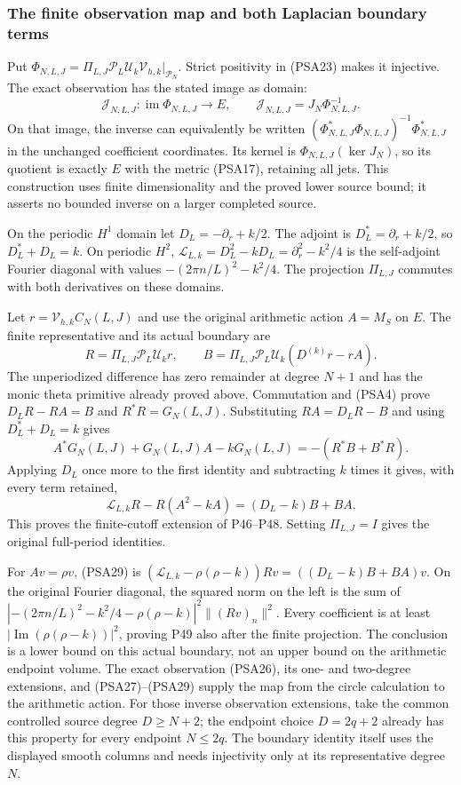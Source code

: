 \subsubsection{The finite observation map and both Laplacian boundary terms}

Put $\Phi_{N,L,J}=\Pi_{L,J}\mathcal P_L\mathcal U_k
\mathcal V_{h,k}|_{\mathcal P_N}$. Strict positivity in (PSA23)
makes it injective. The exact observation has the stated image as
domain:
\[
 \mathcal J_{N,L,J}:\operatorname{im}\Phi_{N,L,J}\longrightarrow E,
 \qquad
 \mathcal J_{N,L,J}=J_N\Phi_{N,L,J}^{-1}.
 \tag{PSA26}
\]
On that image, the inverse can equivalently be written
$(\Phi_{N,L,J}^*\Phi_{N,L,J})^{-1}\Phi_{N,L,J}^*$ in the unchanged
coefficient coordinates. Its kernel is
$\Phi_{N,L,J}(\ker J_N)$, so its quotient is exactly $E$ with the
metric (PSA17), retaining all jets. This construction uses finite
dimensionality and the proved lower source bound; it asserts no
bounded inverse on a larger completed source.

On the periodic $H^1$ domain let $D_L=-\partial_r+k/2$.
The adjoint is $D_L^*=\partial_r+k/2$, so $D_L^*+D_L=k$.
On periodic $H^2$, $\mathscr L_{L,k}=D_L^2-kD_L
=\partial_r^2-k^2/4$ is the self-adjoint Fourier diagonal with
values $-(2\pi n/L)^2-k^2/4$. The projection $\Pi_{L,J}$ commutes
with both derivatives on these domains.

Let $r=\mathcal V_{h,k}C_N(L,J)$ and use the original arithmetic
action $A=M_S$ on $E$. The finite representative and its actual
boundary are
\[
 R=\Pi_{L,J}\mathcal P_L\mathcal U_kr,\qquad
 B=\Pi_{L,J}\mathcal P_L\mathcal U_k(D^{(k)}r-rA).
 \tag{PSA27}
\]
The unperiodized difference has zero remainder at degree $N+1$ and
has the monic theta primitive already proved above. Commutation and
(PSA4) prove $D_LR-RA=B$ and $R^*R=G_N(L,J)$. Substituting
$RA=D_LR-B$ and using $D_L^*+D_L=k$ gives
\[
 A^*G_N(L,J)+G_N(L,J)A-kG_N(L,J)
 =-(R^*B+B^*R).
 \tag{PSA28}
\]
Applying $D_L$ once more to the first identity and subtracting $k$
times it gives, with every term retained,
\[
 \mathscr L_{L,k}R-R(A^2-kA)=(D_L-k)B+BA.
 \tag{PSA29}
\]
This proves the finite-cutoff extension of P46--P48. Setting
$\Pi_{L,J}=I$ gives the original full-period identities.

For $Av=\rho v$, (PSA29) is
$(\mathscr L_{L,k}-\rho(\rho-k))Rv=((D_L-k)B+BA)v$.
On the original Fourier diagonal, the squared norm on the left is
the sum of
$|-(2\pi n/L)^2-k^2/4-\rho(\rho-k)|^2\|(Rv)_n\|^2$.
Every coefficient is at least
$|\operatorname{Im}(\rho(\rho-k))|^2$, proving P49 also after the
finite projection. The conclusion is a lower bound on this actual
boundary, not an upper bound on the arithmetic endpoint volume.
The exact observation (PSA26), its one- and two-degree extensions,
and (PSA27)--(PSA29) supply the map from the circle calculation to
the arithmetic action.
For those inverse observation extensions, take the common controlled
source degree $D\ge N+2$; the endpoint choice $D=2q+2$ already has
this property for every endpoint $N\le2q$. The boundary identity
itself uses the displayed smooth columns and needs injectivity only
at its representative degree $N$.

